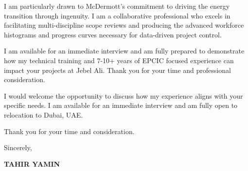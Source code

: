\documentclass[11pt,a4paper]{article}
\begin{document}
I am particularly drawn to McDermott’s commitment to driving the energy transition through ingenuity. I am a collaborative professional who excels in facilitating multi-discipline scope reviews and producing the advanced workforce histograms and progress curves necessary for data-driven project control.

I am available for an immediate interview and am fully prepared to demonstrate how my technical training and 7-10+ years of EPCIC focused experience can impact your projects at Jebel Ali. Thank you for your time and professional consideration.

I would welcome the opportunity to discuss how my experience aligns with your specific needs. I am available for an immediate interview and am fully open to relocation to Dubai, UAE.

Thank you for your time and consideration.

\vspace{0.5cm}
Sincerely,

\vspace{0.5cm}
\textbf{TAHIR YAMIN}
\end{document}
